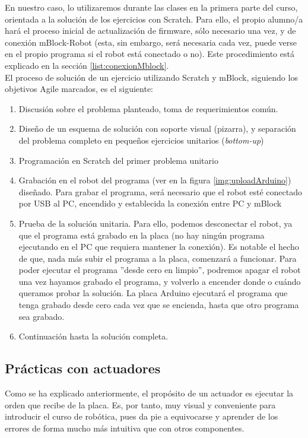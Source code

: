 En nuestro caso, lo utilizaremos durante las clases en la primera parte del curso, orientada a la solución de los ejercicios con Scratch. 
Para ello, el propio alumno/a hará el proceso inicial de actualización de firmware, sólo necesario una vez, y de conexión mBlock-Robot (esta, sin embargo, será necesaria cada vez, puede verse en el propio programa si el robot está conectado o no). Este procedimiento está explicado en la sección \ref{list:conexionMblock}. \\
El proceso de solución de un ejercicio utilizando Scratch y mBlock, siguiendo los objetivos Agile marcados, es el siguiente:
\begin{enumerate}
	\item Discusión sobre el problema planteado, toma de requerimientos común.
	\item Diseño de un esquema de solución con soporte visual (pizarra), y separación del problema completo en pequeños ejercicios unitarios (\textit{bottom-up})
	\item Programación en Scratch del primer problema unitario
	\item Grabación en el robot del programa (ver en la figura \ref{img:uploadArduino}) diseñado. Para grabar el programa, será necesario que el robot esté conectado por USB al PC, encendido y establecida la conexión entre PC y mBlock
	\item Prueba de la solución unitaria. Para ello, podemos desconectar el robot, ya que el programa está grabado en la placa (no hay ningún programa ejecutando en el PC que requiera mantener la conexión). Es notable el hecho de que, nada más subir el programa a la placa, comenzará a funcionar. Para poder ejecutar el programa ''desde cero en limpio'', podremos apagar el robot una vez hayamos grabado el programa, y volverlo a encender donde o cuándo queramos probar la solución. La placa Arduino ejecutará el programa que tenga grabado desde cero cada vez que se encienda, hasta que otro programa sea grabado.
	\item Continuación hasta la solución completa.
\end{enumerate}
\subsection{Prácticas con actuadores} \label{subsec:practicasactuadores}
 Como se ha explicado anteriormente, el propósito de un actuador es ejecutar la orden que recibe de la placa. Es, por tanto, muy visual y conveniente para introducir el curso de robótica, pues da pie a equivocarse y aprender de los errores de forma mucho más intuitiva que con otros componentes.
 
